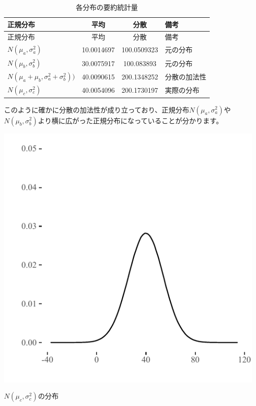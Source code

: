 \documentclass[]{tufte-handout}
\begin{document}
\begin{longtable}[]{@{}lccl@{}}
\caption{各分布の要約統計量}\tabularnewline
\toprule
正規分布 & 平均 & 分散 & 備考 \\
\midrule
\endfirsthead
\toprule
正規分布 & 平均 & 分散 & 備考 \\
\midrule
\endhead
\(N(\mu_a, \sigma^2_a)\) & 10.0014697 & 100.0509323 & 元の分布 \\
\(N(\mu_b, \sigma^2_b)\) & 30.0075917 & 100.083893 & 元の分布 \\
\(N(\mu_a + \mu_b, \sigma^2_a + \sigma^2_b))\) & 40.0090615 &
200.1348252 & 分散の加法性 \\
\(N(\mu_c, \sigma^2_c)\) & 40.0054096 & 200.1730197 & 実際の分布 \\
\bottomrule
\end{longtable}

このように確かに分散の加法性が成り立っており、正規分布\(N(\mu_a, \sigma^2_a)\)や\(N(\mu_b,\sigma^2_b)\)より横に広がった正規分布になっていることが分かります。

\begin{marginfigure}

{\centering \includegraphics{AdditivityOfVariance_files/figure-latex/unnamed-chunk-5-1} 

}

\caption[$N(\mu_c, \sigma^2_c)$の分布]{$N(\mu_c, \sigma^2_c)$の分布}\label{fig:unnamed-chunk-5}
\end{marginfigure}
\end{document}
